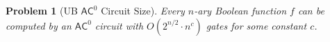 \documentclass[11pt]{article}
\newcommand\class[1]{\mathsf{#1}}
\newcommand\vv[1]{\mathbf{#1}}
\newtheorem{problem}{Problem}
\DeclarePairedDelimiter\ceil{\lceil}{\rceil}
\begin{document}
\begin{comment}
\end{proof}
\item There exist DeMorgan circuits of depth $O(\log n)$ which take an input $\vv{x} \in \{0,1\}^n$ and outputs a $\ceil{\log n}$ bit number $u$ such that $u = |\vv{x}|$. 
\begin{proof}
Consider every bit in the input as a $1$-digit number. Construct a tree of $3$-to-$2$ addition gadgets as described in the previous part. Every level $i$ of the tree has two thirds as many number as level $i + 1$ and each number is longer by one bit. Thus, after $\log n$ levels, there will be a single output of length $\ceil{\log n}$.  
\end{proof}
\item Every symmetric function can be computed by DeMorgan circuits of size $O(n)$ and depth $O(\log n)$.

\emph{Solution.} By part 3 there exists a DeMorgan circuit $C$ of depth $O(\log n)$ which takes $n$ bits as input and outputs a $\ceil{\log n}$ bit number $u$ representing the hamming weight of $\vv{x}$. 

For every subset $S \subseteq [\ceil{\log n}]$ create an $\land$-gate representing the ``and'' of all variables with indices in $S$. This can be done recursively as follows: let $S_1, ..., S_{\ceil{\log n}}$ be the output of $C$. On the next level, let $S_{i_1,i_2} = S_{i_1} \land S_{i_2}$. Generally let $S_{i_1, ..., i_j} = S_{i_1, ..., i_{j-1}} \land S_{i_j}$. Finally take the $\lor$ of at most $n$ subsets $S$ representing numbers which satisfy the symmetric function. There $O(n)$ gates in $C$, $n$ gates representing the subsets of $[\ceil{\log n}]$, and $O(n)$ gates used to choose the satisfying numbers. Thus every symmetric function can be computed by a DeMorgan circuit of size $O(n)$ (and depth $O(\log n)$).
\end{enumerate}
\end{comment}
\addtocounter{problem}{1}
\newpage
\begin{problem}[UB $\class{AC}^0$ Circuit Size] Every $n$-ary Boolean function $f$ can be computed by an $\class{AC}^0$ circuit with $O(2^{n/2} \cdot n^c)$ gates for some constant $c$.
\end{problem}
\end{document}
